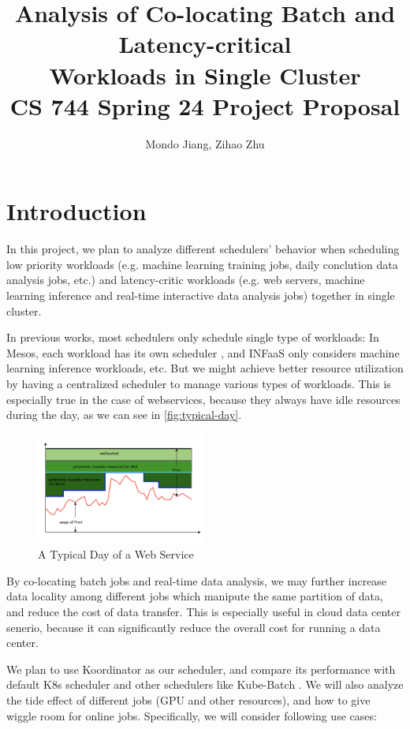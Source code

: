 \documentclass[pdftex,twocolumn,10pt,letterpaper]{article}
\title{
    {
     Analysis of Co-locating Batch and Latency-critical\\
     Workloads in Single Cluster\\
     \large  CS 744 Spring 24 Project Proposal
    }
}
\author{Mondo Jiang, Zihao Zhu}
\date{}
\begin{document}
\maketitle

\section*{Introduction}
In this project, we plan to analyze different schedulers' behavior when scheduling low priority workloads (e.g. machine learning training jobs, daily conclution data analysis jobs, etc.)  and latency-critic workloads (e.g. web servers, machine learning inference and real-time interactive data analysis jobs) together in single cluster.

In previous works, most schedulers only schedule single type of workloads:
In Mesos, each workload has its own scheduler \cite{hindman2011mesos}, and INFaaS \cite{romero2021infaas} only considers machine learning inference workloads, etc. But we might achieve better resource utilization by having a centralized scheduler to manage various types of workloads. This is especially true in the case of webservices, because they always have idle resources during the day, as we can see in \autoref{fig:typical-day}.

\begin{figure}[h]
	\centering
	\includegraphics[width=0.5\textwidth]{fig/koo-time.png}
	\caption{A Typical Day of a Web Service \cite{koo}}
	\label{fig:typical-day}
\end{figure}

By co-locating batch jobs and real-time data analysis, we may further increase data locality among different jobs which manipute the same partition of data, and reduce the cost of data transfer. This is especially useful in cloud data center senerio, because it can significantly reduce the overall cost for running a data center.

We plan to use Koordinator \cite{koo} as our scheduler, and compare its performance with default K8s scheduler and other schedulers like Kube-Batch \cite{kube-batch}. We will also analyze the tide effect of different jobs (GPU and other resources), and how to give wiggle room for online jobs. Specifically, we will consider following use cases:
\end{document}
